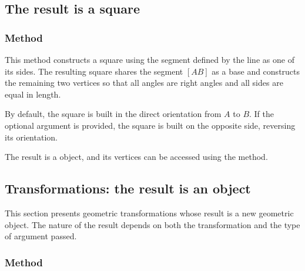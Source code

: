 \subsection{The result is a square}


\subsubsection{Method }
\label{ssub:method_line_square}

This method constructs a square using the segment defined by the line as one of its sides. The resulting square shares the segment $[AB]$ as a base and constructs the remaining two vertices so that all angles are right angles and all sides are equal in length.

\medskip

By default, the square is built in the direct orientation from $A$ to $B$. If the optional argument  is provided, the square is built on the opposite side, reversing its orientation.

\medskip

The result is a  object, and its vertices can be accessed using the  method.

\vspace{1em}

\begin{tkzexample}[latex=.5\textwidth]

\end{tkzexample}

\subsection{Transformations: the result is an object}
\label{sub:the_result_is_an_object}

This section presents geometric transformations whose result is a new geometric object. The nature of the result depends on both the transformation and the type of argument passed.


\subsubsection{Method }
\label{ssub:example_projection_of_several_points}

